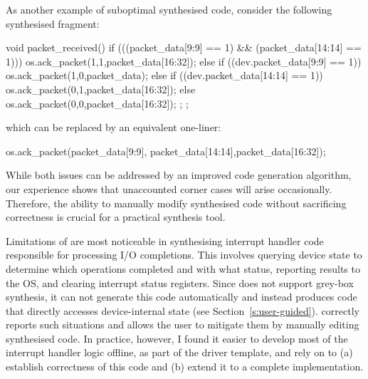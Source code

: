 As another example of suboptimal synthesised code, consider the following synthesised fragment:

\vspace{5mm}
\begin{tsllisting}
void packet_received() {
    if (((packet_data[9:9] == 1) && (packet_data[14:14] == 1))) {
        os.ack_packet(1,1,packet_data[16:32]);
    } else if ((dev.packet_data[9:9] == 1)) {
        os.ack_packet(1,0,packet_data);
    } else if ((dev.packet_data[14:14] == 1)) {
        os.ack_packet(0,1,packet_data[16:32]);
    } else {
        os.ack_packet(0,0,packet_data[16:32]);
    };
};
\end{tsllisting}
\vspace{3mm}

which can be replaced by an equivalent one-liner:

\vspace{5mm}
\begin{tsllisting}
os.ack_packet(packet_data[9:9],
    packet_data[14:14],packet_data[16:32]);
\end{tsllisting}
\vspace{5mm}

\noindent While both issues can be addressed by an improved code generation algorithm, our experience shows that unaccounted corner cases will arise occasionally.  Therefore, the ability to manually modify synthesised code without sacrificing correctness is crucial for a practical synthesis tool.

Limitations of \termite are most noticeable in synthesising interrupt handler code responsible for processing I/O completions.  This involves querying device state to determine which operations completed and with what status, reporting results to the OS, and clearing interrupt status registers.  Since \termite does not support grey-box synthesis, it can not generate this code automatically and instead produces code that directly accesses device-internal state (see Section~\ref{s:user-guided}).  \termite correctly reports such situations and allows the user to mitigate them by manually editing synthesised code.  In practice, however, I found it easier to develop most of the interrupt handler logic offline, as part of the driver template, and rely on \termite to (a) establish correctness of this code and (b) extend it to a complete implementation.

